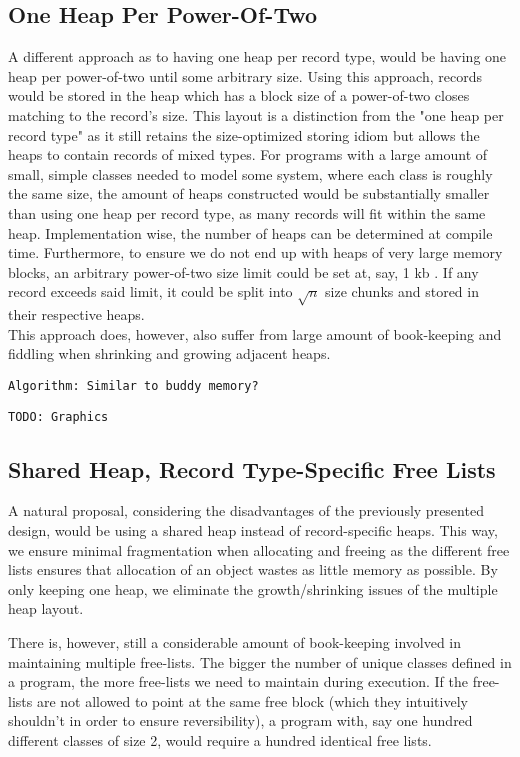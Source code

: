 \subsection{One Heap Per Power-Of-Two}
\label{subsec:one-heap-per-power-of-two}
A different approach as to having one heap per record type, would be having one heap per power-of-two until some arbitrary size. Using this approach, records would be stored in the heap which has a block size of a power-of-two closes matching to the record's size. This layout is a distinction from the "one heap per record type" as it still retains the size-optimized storing idiom but allows the heaps to contain records of mixed types. For programs with a large amount of small, simple classes needed to model some system, where each class is roughly the same size, the amount of heaps constructed would be substantially smaller than using one heap per record type, as many records will fit within the same heap. Implementation wise, the number of heaps can be determined at compile time. Furthermore, to ensure we do not end up with heaps of very large memory blocks, an arbitrary power-of-two size limit could be set at, say, 1 kb . If any record exceeds said limit, it could be split into $\sqrt{n}$ size chunks and stored in their respective heaps.\\
This approach does, however, also suffer from large amount of book-keeping and fiddling when shrinking and growing adjacent heaps.

\texttt{Algorithm: Similar to buddy memory?}

\texttt{TODO: Graphics}

\subsection{Shared Heap, Record Type-Specific Free Lists}
\label{subsec:shared-heap}
A natural proposal, considering the disadvantages of the previously presented design, would be using a shared heap instead of record-specific heaps. 
This way, we ensure minimal fragmentation when allocating and freeing as the different free lists ensures that allocation of an object wastes as little memory as possible. By only keeping one heap, we eliminate the growth/shrinking issues of the multiple heap layout. 

There is, however, still a considerable amount of book-keeping involved in maintaining multiple free-lists. The bigger the number of unique classes defined in a program, the more free-lists we need to maintain during execution. If the free-lists are not allowed to point at the same free block (which they intuitively shouldn't in order to ensure reversibility), a program with, say one hundred different classes of size 2, would require a hundred identical free lists. 

